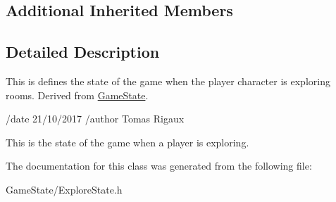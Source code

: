 \subsection*{Additional Inherited Members}


\subsection{Detailed Description}
This is defines the state of the game when the player character is exploring rooms. Derived from \hyperlink{classGameState}{Game\-State}. 

/date 21/10/2017 /author Tomas Rigaux

This is the state of the game when a player is exploring. 

The documentation for this class was generated from the following file\-:\begin{DoxyCompactItemize}
\item 
Game\-State/Explore\-State.\-h\end{DoxyCompactItemize}
